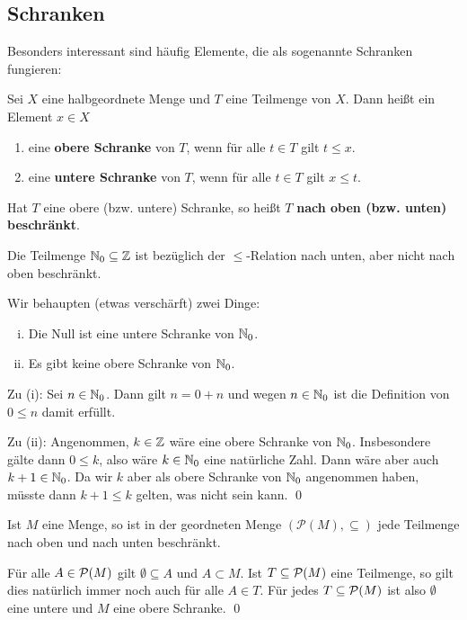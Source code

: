 \subsection{Schranken}
Besonders interessant sind häufig Elemente, die als sogenannte Schranken fungieren:
\begin{de}[Schranken] \label{schranken}
	Sei $X$ eine halbgeordnete Menge und $T$ eine Teilmenge von $X$. Dann heißt ein Element $x\in X$
		\begin{enumerate}
			\item eine \textbf{obere Schranke} von $T$, wenn für alle $t\in T$ gilt $t\leq x$.
			\item eine \textbf{untere Schranke} von $T$, wenn für alle $t\in T$ gilt $x\leq t$.
		\end{enumerate}
	Hat $T$ eine obere (bzw. untere) Schranke, so heißt $T$ \textbf{nach oben (bzw. unten) beschränkt}.
\end{de}

\begin{bsp}\label{SchrankenZ}
	Die Teilmenge ${\mathbb N}_0\subseteq{\mathbb Z}$ ist bezüglich der $\leq$-Relation nach unten, aber nicht nach oben beschränkt.
\end{bsp}
\begin{bew}
Wir behaupten (etwas verschärft) zwei Dinge: 
	\begin{enumerate}[(i)]
		\item Die Null ist eine untere Schranke von ${\mathbb N}_0$.
		\item Es gibt keine obere Schranke von ${\mathbb N}_0$.
	\end{enumerate}
	
	Zu (i): Sei $n\in{\mathbb N}_0$. Dann gilt $n=0+n$ und wegen $n\in{\mathbb N}_0$ ist die Definition von $0\leq n$ damit erfüllt.
	
	Zu (ii): Angenommen, $k\in{\mathbb Z}$ wäre eine obere Schranke von ${\mathbb N}_0$. Insbesondere gälte dann $0\leq k$, also wäre $k\in{\mathbb N}_0$ eine natürliche Zahl. Dann wäre aber auch $k+1\in{\mathbb N}_0$. Da wir $k$ aber als obere Schranke von ${\mathbb N}_0$ angenommen haben, müsste dann $k+1\leq k$ gelten, was nicht sein kann. \qed
\end{bew}

\begin{bsp}
	Ist $M$ eine Menge, so ist in der geordneten Menge $(\mathcal{P}(M),\subseteq)$ jede Teilmenge nach oben und nach unten beschränkt.
\end{bsp}
\begin{bew}
 Für alle $A\in{\mathcal P}(M)$ gilt $\emptyset\subseteq A$ und $A\subset M$. Ist $T\subseteq{\mathcal P}(M)$ eine Teilmenge, so gilt dies natürlich immer noch auch für alle $A\in T$. Für jedes $T\subseteq{\mathcal P}(M)$ ist also $\emptyset$ eine untere und $M$ eine obere Schranke. \qed
\end{bew}

